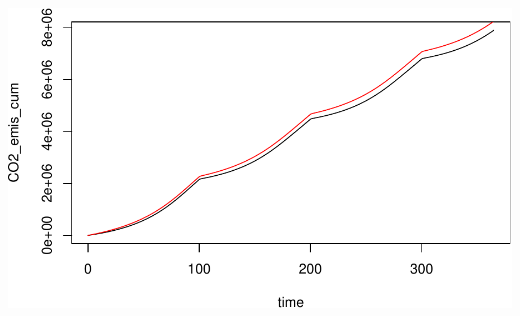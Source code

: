\documentclass[
]{article}
\begin{document}
\includegraphics{simple_demo_files/figure-latex/unnamed-chunk-101-1.pdf}
\end{document}

